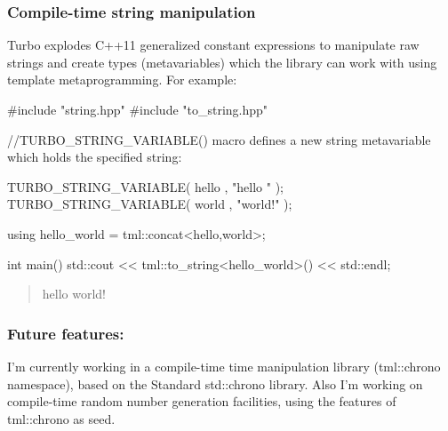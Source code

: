 \subsubsection*{Compile-\/time string manipulation}

Turbo explodes C++11 generalized constant expressions to manipulate raw strings and create types (metavariables) which the library can work with using template metaprogramming. For example\+: \begin{DoxyVerb}#include "string.hpp"
#include "to_string.hpp"

//TURBO_STRING_VARIABLE() macro defines a new string metavariable which holds the specified string:

TURBO_STRING_VARIABLE( hello , "hello " );
TURBO_STRING_VARIABLE( world , "world!" );

using hello_world = tml::concat<hello,world>;

int main()
{
    std::cout << tml::to_string<hello_world>() << std::endl;
}
\end{DoxyVerb}


\begin{quote}
hello world! \end{quote}


\subsubsection*{Future features\+:}

I'm currently working in a compile-\/time time manipulation library ({\ttfamily tml\+::chrono} namespace), based on the Standard {\ttfamily std\+::chrono} library. Also I'm working on compile-\/time random number generation facilities, using the features of {\ttfamily tml\+::chrono} as seed. 